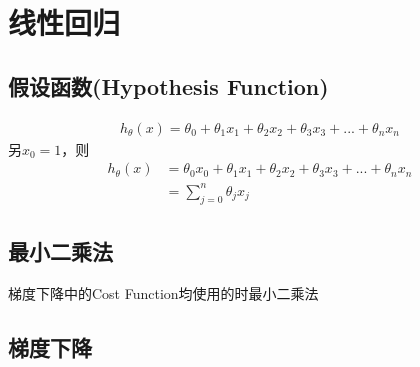 \section{线性回归}
\subsection{假设函数(Hypothesis Function)}
\begin{equation}\begin{aligned}
	h_\theta(x) = \theta_0 + \theta_1x_1 + \theta_2x_2 + \theta_3x_3 + ... + \theta_nx_n
\end{aligned}\end{equation}
另$x_0=1$，则
\begin{equation}\begin{aligned}
	h_\theta(x) &= \theta_0x_0 + \theta_1x_1 + \theta_2x_2 + \theta_3x_3 + ... + \theta_nx_n \\
	&= \sum_{j=0}^n{\theta_jx_j}
\end{aligned}\end{equation}

\subsection{最小二乘法}
梯度下降中的Cost Function均使用的时最小二乘法

\subsection{梯度下降}
